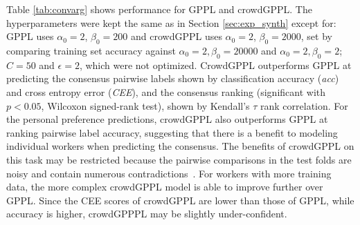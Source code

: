 Table \ref{tab:convarg} shows performance for GPPL and crowdGPPL. 
The hyperparameters were kept the same as in Section \ref{sec:exp_synth} 
except for: GPPL uses $\alpha_0 = 2$, $\beta_0 = 200$ and
crowdGPPL uses $\alpha_0=2$, $\beta_0=2000$, set by comparing
training set accuracy against $\alpha_0=2, \beta_0 = 20000$ and $\alpha_0 = 2, \beta_0 = 2$;
$C=50$ and $\epsilon=2$, which were not optimized.
CrowdGPPL outperforms GPPL at predicting the consensus pairwise labels
shown by classification accuracy (\emph{acc}) and cross entropy error (\emph{CEE}),
and the consensus ranking (significant with $p<0.05$, Wilcoxon signed-rank test), 
shown by Kendall's $\tau$ rank correlation.
For the personal preference predictions, crowdGPPL also outperforms 
GPPL at ranking pairwise label accuracy, suggesting that there is a benefit
to modeling individual workers when predicting the consensus. 
The benefits of crowdGPPL on this task may be restricted
because the pairwise comparisons in the test folds are noisy and contain
numerous contradictions~\citep{habernal2016argument}.
For workers with more training data, the more complex crowdGPPL model is able to improve further over GPPL.
Since the CEE scores of crowdGPPL are lower than those of GPPL, while accuracy is higher, 
crowdGPPPL may be slightly under-confident.
